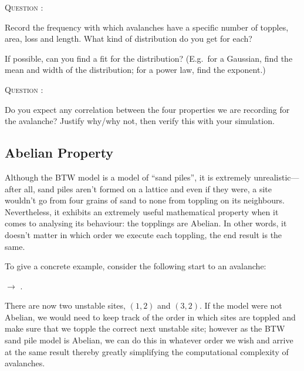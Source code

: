 \documentclass[
  a4paper,             %
  11pt,                %
  oneside,             %
  onecolumn,           %
  bibliography=totoc,  %
  final,               %
]{scrartcl}
\newcounter{question}
\newenvironment{question}{%
  \stepcounter{question}%
  \begin{tcolorbox}[
      colframe=black,
      sharp corners=all,
      boxsep=0.5ex,
    ]
    \noindent\textsc{\large Question \arabic{question}:} %
}{%
  \end{tcolorbox}%
}
\begin{document}
\begin{question}
  Record the frequency with which avalanches have a specific number of topples,
  area, loss and length.  What kind of distribution do you get for each?

  If possible, can you find a fit for the distribution?  (E.g.~for a Gaussian,
  find the mean and width of the distribution; for a power law, find the
  exponent.)
\end{question}

\begin{question}
  Do you expect any correlation between the four properties we are recording for
  the avalanche?  Justify why/why not, then verify this with your simulation.
\end{question}

\subsection{Abelian Property}
\label{subsec:abelian_property}

Although the \gls{BTW} model is a model of \enquote{sand piles}, it is extremely
unrealistic---after all, sand piles aren't formed on a lattice and even if they
were, a site wouldn't go from four grains of sand to none from toppling on its
neighbours.  Nevertheless, it exhibits an extremely useful mathematical property
when it comes to analysing its behaviour: the topplings are Abelian.  In other
words, it doesn't matter in which order we execute each toppling, the end result
is the same.

To give a concrete example, consider the following start to an avalanche:
\begin{center}
  \Large
  \renewcommand{\arraystretch}{1.2}
  \(\rightarrow\)
  .
\end{center}
There are now two unstable sites, \((1, 2)\) and \((3, 2)\).  If the model were
not Abelian, we would need to keep track of the order in which sites are toppled
and make sure that we topple the correct next unstable site; however as the
\gls{BTW} sand pile model is Abelian, we can do this in whatever order we wish
and arrive at the same result thereby greatly simplifying the computational
complexity of avalanches.
\end{document}
